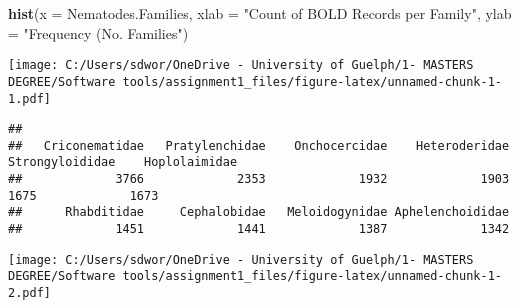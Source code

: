 \documentclass[
]{article}
\newenvironment{Shaded}{\begin{snugshade}}{\end{snugshade}}
\newcommand{\AttributeTok}[1]{\textcolor[rgb]{0.13,0.29,0.53}{#1}}
\newcommand{\CommentTok}[1]{\textcolor[rgb]{0.56,0.35,0.01}{\textit{#1}}}
\newcommand{\ConstantTok}[1]{\textcolor[rgb]{0.56,0.35,0.01}{#1}}
\newcommand{\DecValTok}[1]{\textcolor[rgb]{0.00,0.00,0.81}{#1}}
\newcommand{\FunctionTok}[1]{\textcolor[rgb]{0.13,0.29,0.53}{\textbf{#1}}}
\newcommand{\NormalTok}[1]{#1}
\newcommand{\OtherTok}[1]{\textcolor[rgb]{0.56,0.35,0.01}{#1}}
\newcommand{\SpecialCharTok}[1]{\textcolor[rgb]{0.81,0.36,0.00}{\textbf{#1}}}
\newcommand{\StringTok}[1]{\textcolor[rgb]{0.31,0.60,0.02}{#1}}
\begin{document}
\begin{Shaded}
\begin{Highlighting}[]
\FunctionTok{hist}\NormalTok{(}\AttributeTok{x =}\NormalTok{ Nematodes.Families, }\AttributeTok{xlab =} \StringTok{"Count of BOLD Records per Family"}\NormalTok{, }\AttributeTok{ylab =} \StringTok{"Frequency (No. Families"}\NormalTok{)}
\end{Highlighting}
\end{Shaded}

\texttt{[image: C:/Users/sdwor/OneDrive - University of Guelph/1- MASTERS DEGREE/Software tools/assignment1\_files/figure-latex/unnamed-chunk-1-1.pdf]}

\begin{Shaded}
\end{Shaded}

\begin{verbatim}
## 
##   Criconematidae   Pratylenchidae    Onchocercidae    Heteroderidae  Strongyloididae    Hoplolaimidae 
##             3766             2353             1932             1903             1675             1673 
##      Rhabditidae     Cephalobidae   Meloidogynidae Aphelenchoididae 
##             1451             1441             1387             1342
\end{verbatim}

\begin{Shaded}
\end{Shaded}

\texttt{[image: C:/Users/sdwor/OneDrive - University of Guelph/1- MASTERS DEGREE/Software tools/assignment1\_files/figure-latex/unnamed-chunk-1-2.pdf]}

\begin{Shaded}
\end{Shaded}
\end{document}
